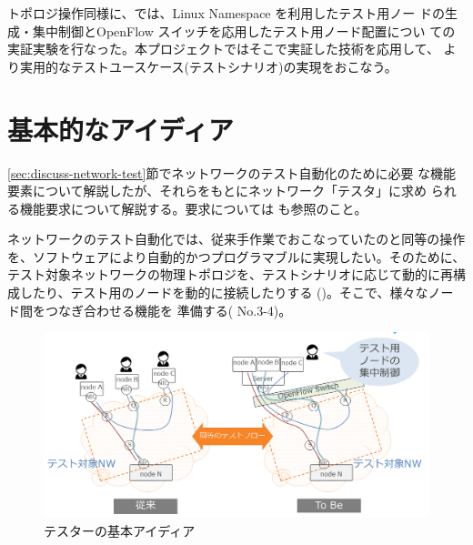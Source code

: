 トポロジ操作同様に、\lopjc では、Linux Namespace を利用したテスト用ノー
ドの生成・集中制御とOpenFlow スイッチを応用したテスト用ノード配置につい
ての実証実験を行なった。本プロジェクトではそこで実証した技術を応用して、
より実用的なテストユースケース(テストシナリオ)の実現をおこなう。

 \section{基本的なアイディア}
 \label{sec:basic-tester-idea}



\ref{sec:discuss-network-test}節でネットワークのテスト自動化のために必要
な機能要素について解説したが、それらをもとにネットワーク「テスタ」に求め
られる機能要求について解説する。要求については \lopjtech も参照のこと。

ネットワークのテスト自動化では、従来手作業でおこなっていたのと同等の操作
を、ソフトウェアにより自動的かつプログラマブルに実現したい。そのために、
テスト対象ネットワークの物理トポロジを、テストシナリオに応じて動的に再構
成したり、テスト用のノードを動的に接続したりする
()。そこで、様々なノード間をつなぎ合わせる機能を
準備する( No.3-4)。

\begin{figure}[h]
 \centering
 \includegraphics[scale=0.5]{img/basic-idea.png}
 \caption{テスターの基本アイディア}
 \label{fig:basic-idea}
\end{figure}

